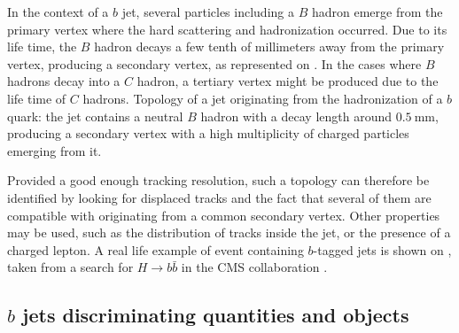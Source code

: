     In the context of a $b$ jet, several particles including a $B$ hadron emerge from
    the primary vertex where the hard scattering and hadronization occurred. Due to its
    life time, the $B$ hadron decays a few tenth of millimeters away from the primary
    vertex, producing a secondary vertex, as represented on .
    In the cases where $B$ hadrons decay into a $C$ hadron, a tertiary vertex might
    be produced due to the life time of $C$ hadrons.
                 {Topology of a jet originating from the hadronization of a $b$ quark: the
                 jet contains a neutral $B$ hadron with a decay length around $0.5~\text{mm}$,
                 producing a secondary vertex with a high multiplicity of charged particles
                 emerging from it.}

    Provided a good enough tracking resolution, such a topology can therefore be identified
    by looking for displaced tracks and the fact that several of them are compatible with
    originating from a common secondary vertex. Other properties may be used, such as the
    distribution of tracks inside the jet, or the presence of a charged lepton. A
    real life example of event containing $b$-tagged jets is shown on ,
    taken from a search for $H\rightarrow b\bar{b}$ in the CMS collaboration \cite{HIG-13-011}.


    \subsection{$b$ jets discriminating quantities and objects}

